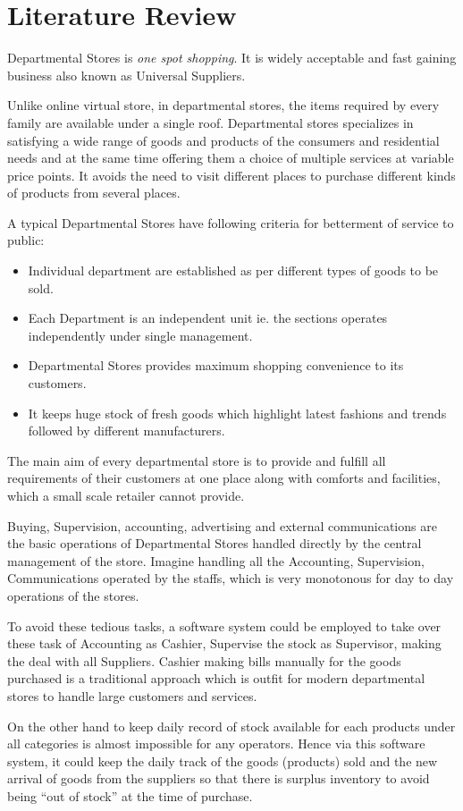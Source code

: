 \section{Literature Review}

Departmental Stores is {\em one spot shopping}. It is widely acceptable and
fast gaining business also known as Universal Suppliers.

Unlike online virtual store, in departmental stores, the items required by
every family are available under a single roof. Departmental stores specializes
in satisfying a wide range of goods and products of the consumers and
residential needs and at the same time offering them a choice of multiple
services at variable price points. It avoids the need to visit different places
to purchase different kinds of products from several places.

A typical Departmental Stores have following criteria for betterment of service
to public:
\begin{itemize}[noitemsep,topsep=0pt]
  \item Individual department are established as per different types of goods
    to be sold.
  \item Each Department is an independent unit ie. the sections operates
    independently under single management.
  \item Departmental Stores provides maximum shopping convenience to its
    customers.
  \item It keeps huge stock of fresh goods which highlight latest fashions and
    trends followed by different manufacturers.
\end{itemize}

The main aim of every departmental store is to provide and fulfill all
requirements of their customers at one place along with comforts and
facilities, which a small scale retailer cannot provide.

Buying, Supervision, accounting, advertising and external communications are
the basic operations of Departmental Stores handled directly by the central
management of the store. Imagine handling all the Accounting, Supervision,
Communications operated by the staffs, which is very monotonous for day to day
operations of the stores.

To avoid these tedious tasks, a software system could be employed to take over
these task of Accounting as Cashier, Supervise the stock as Supervisor, making
the deal with all Suppliers. Cashier making bills manually for the goods
purchased is a traditional approach which is outfit for modern departmental
stores to handle large customers and services.

On the other hand to keep daily record of stock available for each products
under all categories is almost impossible for any operators. Hence via this
software system, it could keep the daily track of the goods (products) sold and
the new arrival of goods from the suppliers so that there is surplus inventory
to avoid being ``out of stock'' at the time of purchase.

